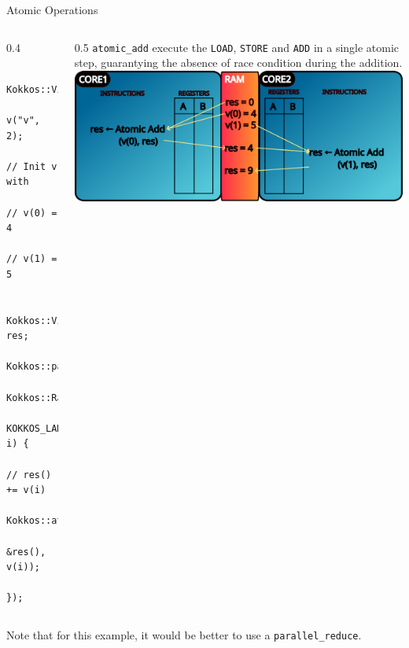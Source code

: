 \documentclass[
    aspectratio=169,
    handout,
]{beamer}
\begin{document}
\begin{frame}[fragile]{Atomic Operations}
    \begin{columns}
        \begin{column}{0.4\linewidth}
            \begin{verbatim}
              Kokkos::View<double*>
                v("v", 2);
              // Init v with
              // v(0) = 4
              // v(1) = 5

              Kokkos::View<double> res;
              Kokkos::parallel_for(
                Kokkos::RangePolicy(0,2),
                KOKKOS_LAMBDA(int i) {
                  // res() += v(i)
                  Kokkos::atomic_add(
                    &res(), v(i));
                });
            \end{verbatim}
        \end{column}
        \begin{column}{0.5\linewidth}
          \texttt{atomic\_add} execute the \texttt{LOAD}, \texttt{STORE} and \texttt{ADD} in a single atomic step,
          guarantying the absence of race condition during the addition.
          \includegraphics[width=1\textwidth]{race_condition3.png}
        \end{column}
    \end{columns}
  \pause
  Note that for this example, it would be better to use a \texttt{parallel\_reduce}.
\end{frame}
\end{document}
